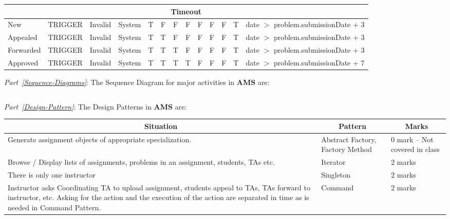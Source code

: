 \documentclass{article}
\begin{document}
\begin{enumerate}
\begin{center}
\begin{scriptsize}
\begin{tabular}{|l|l|l|l|c|c|c|c|c|c|c|c|p{4cm}|}
\multicolumn{13}{|c|}{\bf Timeout} \\ \hline
\textsf{New} 		& TRIGGER 	& \textsf{Invalid} 	& System	& T	& F & F & F & F & F & F & T & \textsf{date} $>$ \textsf{problem.submissionDate} + 3 \\ \hline
\textsf{Appealed} 	& TRIGGER 	& \textsf{Invalid}	& System	& T & T & F & F & F & F & F & T & \textsf{date} $>$ \textsf{problem.submissionDate} + 3 \\ \hline
\textsf{Forwarded} 	& TRIGGER 	& \textsf{Invalid}	& System	& T & T & T & F & F	& F & F & T & \textsf{date} $>$ \textsf{problem.submissionDate} + 3 \\ \hline
\textsf{Approved} 	& TRIGGER 	& \textsf{Invalid} 	& System	& T & T & T & T & F	& F & F & T & \textsf{date} $>$ \textsf{problem.submissionDate} + 7 \\ \hline
\end{tabular}
\end{scriptsize}
\end{center}

{\em Part~\ref{Sequence-Diagrams}}: The Sequence Diagram for major activities in {\bf AMS} are:
\begin{center}
\begin{tabular}{|l|} \hline
\\ \hline
\end{tabular}
\end{center}

{\em Part~\ref{Design-Pattern}}: The Design Patterns in {\bf AMS} are:

\begin{center}
\begin{scriptsize}
\begin{tabular}{|p{10cm}|p{2cm}|l|} \hline
\multicolumn{1}{|c}{\bf Situation} & \multicolumn{1}{|c}{\bf Pattern} & \multicolumn{1}{|c|}{\bf Marks} \\ \hline
Generate assignment objects of appropriate specialization. & Abstract Factory, Factory Method & 0 mark -- Not covered in class \\ \hline
Browse / Display lists of assignments, problems in an assignment, students, TAs etc. & Iterator & 2 marks \\ \hline
There is only one instructor & Singleton & 2 marks \\ \hline
Instructor asks Coordinating TA to upload assignment, students appeal to TAs, TAs forward to instructor, etc. Asking for the action and the execution of the action are separated in time as is needed in Command Pattern. & Command & 2 marks \\ \hline
\end{tabular}
\end{scriptsize}
\end{center}


\end{enumerate}
\end{document}
